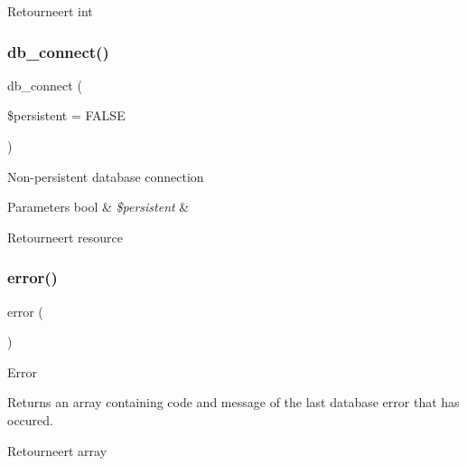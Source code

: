 \begin{DoxyReturn}{Retourneert}
int 
\end{DoxyReturn}
\mbox{\label{class_c_i___d_b__sqlite__driver_a52bf595e79e96cc0a7c907a9b45aeb4d}} 
\subsubsection{\texorpdfstring{db\_connect()}{db\_connect()}}
{\footnotesize\ttfamily db\+\_\+connect (\begin{DoxyParamCaption}\item[{}]{\$persistent = {\ttfamily FALSE} }\end{DoxyParamCaption})}

Non-\/persistent database connection


\begin{DoxyParams}[1]{Parameters}
bool & {\em \$persistent} & \\
\hline
\end{DoxyParams}
\begin{DoxyReturn}{Retourneert}
resource 
\end{DoxyReturn}
\mbox{\label{class_c_i___d_b__sqlite__driver_a43b8d30b879d4f09ceb059b02af2bc02}} 
\subsubsection{\texorpdfstring{error()}{error()}}
{\footnotesize\ttfamily error (\begin{DoxyParamCaption}{ }\end{DoxyParamCaption})}

Error

Returns an array containing code and message of the last database error that has occured.

\begin{DoxyReturn}{Retourneert}
array 
\end{DoxyReturn}
\mbox{\label{class_c_i___d_b__sqlite__driver_a90355121e1ed009e0efdbd544ab56efa}} 

